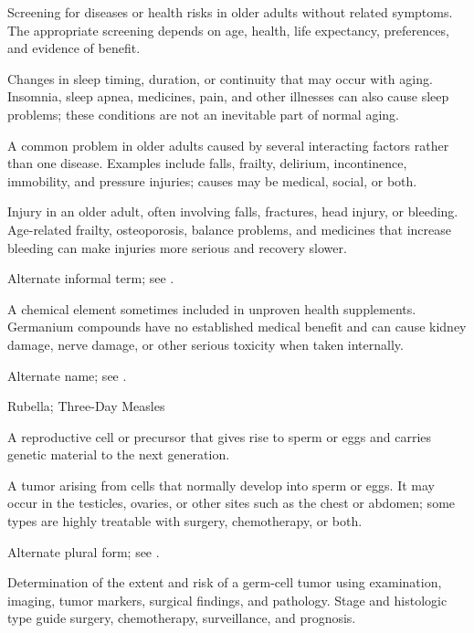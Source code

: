  Screening for diseases or health risks in older adults without related symptoms. The appropriate screening depends on age, health, life expectancy, preferences, and evidence of benefit.

 Changes in sleep timing, duration, or continuity that may occur with aging. Insomnia, sleep apnea, medicines, pain, and other illnesses can also cause sleep problems; these conditions are not an inevitable part of normal aging.

 A common problem in older adults caused by several interacting factors rather than one disease. Examples include falls, frailty, delirium, incontinence, immobility, and pressure injuries; causes may be medical, social, or both.

 Injury in an older adult, often involving falls, fractures, head injury, or bleeding. Age-related frailty, osteoporosis, balance problems, and medicines that increase bleeding can make injuries more serious and recovery slower.

 Alternate informal term; see .

 A chemical element sometimes included in unproven health supplements. Germanium compounds have no established medical benefit and can cause kidney damage, nerve damage, or other serious toxicity when taken internally.

 Alternate name; see .

\synonyms
Rubella; Three-Day Measles

 A reproductive cell or precursor that gives rise to sperm or eggs and carries genetic material to the next generation.

 A tumor arising from cells that normally develop into sperm or eggs. It may occur in the testicles, ovaries, or other sites such as the chest or abdomen; some types are highly treatable with surgery, chemotherapy, or both.

 Alternate plural form; see .

 Determination of the extent and risk of a germ-cell tumor using examination, imaging, tumor markers, surgical findings, and pathology. Stage and histologic type guide surgery, chemotherapy, surveillance, and prognosis.

